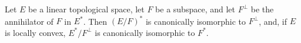 Let $E$ be a linear topological space, let $F$ be a subspace, and let $F^\perp$ be the annihilator of $F$ in $E^*$. Then $(E/F)^*$ is canonically isomorphic to $F^\perp$, and, if $E$ is locally convex, $E^*/F^\perp$ is canonically isomorphic to $F^*$.
